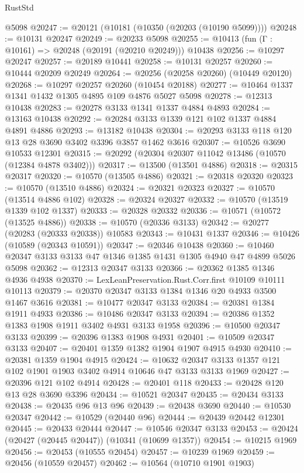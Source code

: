 \begin{lexlean}{RustStd}
\begin{coremodule}
    @5098
@20247 := @20121 (@10181 (@10350 (@20203 (@10190 @5099))))
@20248 := @10131 @20247
@20249 := @20233 @5098
@20255 := @10413 (fun (Γ : @10161) => @20248 (@20191 (@20210 @20249))) @10438
@20256 := @10297 @20247
@20257 := @20189 @10441
@20258 := @10131 @20257
@20260 := @10444 @20209 @20249
@20264 := @20256 (@20258 @20260) (@10449 @20120)
@20268 := @10297 @20257 @20260 (@10454 @20188)
@20277 := @10464 @1337 @1341 @1432 @1305 @4895 @109 @4876 @5027 @5098
@20278 := @12313 @10438
@20283 := @20278 @3133 @1341 @1337 @4884 @4893
@20284 := @13163 @10438
@20292 := @20284 @3133 @1339 @121 @102 @1337 @4884 @4891 @4886
@20293 := @13182 @10438
@20304 := @20293 @3133 @118 @120 @13 @28 @3690 @3402 @3396 @3857 @1462 @3616
@20307 := @10526 @3690 @10533 @12301
@20315 := @20292 (@20304 @20307 @11042 @13486 (@10570 (@12384 @4878 @3402)))
@20317 := @13500 (@13501 @4886)
@20318 := @20315 @20317
@20320 := @10570 (@13505 @4886)
@20321 := @20318 @20320
@20323 := @10570 (@13510 @4886)
@20324 := @20321 @20323
@20327 := @10570 (@13514 @4886 @102)
@20328 := @20324 @20327
@20332 := @10570 (@13519 @1339 @102 @1337)
@20333 := @20328 @20332
@20336 := @10571 (@10572 (@13525 @4886))
@20338 := @10570 (@20336 @3133)
@20342 := @20277 (@20283 (@20333 @20338)) @10583
@20343 := @10431 @1337
@20346 := @10426 (@10589 (@20343 @10591))
@20347 := @20346 @10438
@20360 := @10460 @20347 @3133 @3133 @47 @1346 @1385 @1431 @1305 @4940 @47 @4899 @5026 @5098
@20362 := @12313 @20347 @3133
@20366 := @20362 @1385 @1346 @4936 @4938
@20370 := LexLeanPreservation.Rust.Corr.first @10109 @10111 @10113
@20379 := @20370 @20347 @3133 @1384 @1346 @20 @4933 @3500 @1467 @3616
@20381 := @10477 @20347 @3133
@20384 := @20381 @1384 @1911 @4933
@20386 := @10486 @20347 @3133
@20394 := @20386 @1352 @1383 @1908 @1911 @3402 @4931 @3133 @1958
@20396 := @10500 @20347 @3133
@20399 := @20396 @1383 @1908 @4931
@20401 := @10509 @20347 @3133
@20407 := @20401 @1359 @1382 @1904 @1907 @4915 @4930
@20410 := @20381 @1359 @1904 @4915
@20424 := @10632 @20347 @3133 @1357 @121 @102 @1901 @1903 @3402 @4914 @10646 @47 @3133 @3133 @1969
@20427 := @20396 @121 @102 @4914
@20428 := @20401 @118
@20433 := @20428 @120 @13 @28 @3690 @3396
@20434 := @10521 @20347
@20435 := @20434 @3133
@20438 := @20435 @96 @13 @96
@20439 := @20438 @3690
@20440 := @10530 @20347
@20442 := @10529 (@20440 @96)
@20444 := @20439 @20442 @12301
@20445 := @20433 @20444
@20447 := @10546 @20347 @3133
@20453 := @20424 (@20427 (@20445 @20447)) (@10341 (@10699 @1357))
@20454 := @10215 @1969
@20456 := @20453 (@10555 @20454)
@20457 := @10239 @1969
@20459 := @20456 (@10559 @20457)
@20462 := @10564 (@10710 @1901 @1903)

\end{coremodule}
\end{lexlean}
